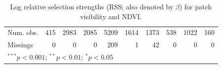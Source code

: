 \begin{table}
\begin{center}
{\begin{tabular}{l D{.}{.}{3.5} D{.}{.}{4.5} D{.}{.}{4.5} D{.}{.}{4.5} D{.}{.}{4.5} D{.}{.}{4.5} D{.}{.}{3.3} D{.}{.}{4.5} D{.}{.}{3.4}}
        Num. obs.        & 415         & 2983        & 2085        & 5209        & 1614        & 1373        & 538       & 1022        & 160         \\
        Missings         & 0           & 0           & 0           & 209         & 1           & 42          & 0         & 0           & 0           \\
        \bottomrule
        \end{tabular}
        }
        \caption{Log relative selection strengths (RSS; also denoted by $\beta$) for patch visibility and NDVI.}
        \label{table:coef_ssa}
    \end{center}

\end{table}

\endgroup

{ \begin{center}  \end{center} }



